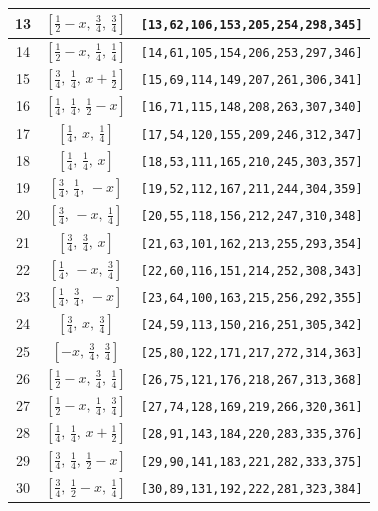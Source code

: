\documentclass[fleqn,8pt]{jsarticle}
\begin{document}
\begin{longtable}{ccc}
13 & $\left[ \frac{1}{2} - x,\, \frac{3}{4},\, \frac{3}{4} \right]$ & {\tt [13,62,106,153,205,254,298,345]} \\ \hline
14 & $\left[ \frac{1}{2} - x,\, \frac{1}{4},\, \frac{1}{4} \right]$ & {\tt [14,61,105,154,206,253,297,346]} \\ \hline
15 & $\left[ \frac{3}{4},\, \frac{1}{4},\, x + \frac{1}{2} \right]$ & {\tt [15,69,114,149,207,261,306,341]} \\ \hline
16 & $\left[ \frac{1}{4},\, \frac{1}{4},\, \frac{1}{2} - x \right]$ & {\tt [16,71,115,148,208,263,307,340]} \\ \hline
17 & $\left[ \frac{1}{4},\, x,\, \frac{1}{4} \right]$ & {\tt [17,54,120,155,209,246,312,347]} \\ \hline
18 & $\left[ \frac{1}{4},\, \frac{1}{4},\, x \right]$ & {\tt [18,53,111,165,210,245,303,357]} \\ \hline
19 & $\left[ \frac{3}{4},\, \frac{1}{4},\, - x \right]$ & {\tt [19,52,112,167,211,244,304,359]} \\ \hline
20 & $\left[ \frac{3}{4},\, - x,\, \frac{1}{4} \right]$ & {\tt [20,55,118,156,212,247,310,348]} \\ \hline
21 & $\left[ \frac{3}{4},\, \frac{3}{4},\, x \right]$ & {\tt [21,63,101,162,213,255,293,354]} \\ \hline
22 & $\left[ \frac{1}{4},\, - x,\, \frac{3}{4} \right]$ & {\tt [22,60,116,151,214,252,308,343]} \\ \hline
23 & $\left[ \frac{1}{4},\, \frac{3}{4},\, - x \right]$ & {\tt [23,64,100,163,215,256,292,355]} \\ \hline
24 & $\left[ \frac{3}{4},\, x,\, \frac{3}{4} \right]$ & {\tt [24,59,113,150,216,251,305,342]} \\ \hline
25 & $\left[ - x,\, \frac{3}{4},\, \frac{3}{4} \right]$ & {\tt [25,80,122,171,217,272,314,363]} \\ \hline
26 & $\left[ \frac{1}{2} - x,\, \frac{3}{4},\, \frac{1}{4} \right]$ & {\tt [26,75,121,176,218,267,313,368]} \\ \hline
27 & $\left[ \frac{1}{2} - x,\, \frac{1}{4},\, \frac{3}{4} \right]$ & {\tt [27,74,128,169,219,266,320,361]} \\ \hline
28 & $\left[ \frac{1}{4},\, \frac{1}{4},\, x + \frac{1}{2} \right]$ & {\tt [28,91,143,184,220,283,335,376]} \\ \hline
29 & $\left[ \frac{3}{4},\, \frac{1}{4},\, \frac{1}{2} - x \right]$ & {\tt [29,90,141,183,221,282,333,375]} \\ \hline
30 & $\left[ \frac{3}{4},\, \frac{1}{2} - x,\, \frac{1}{4} \right]$ & {\tt [30,89,131,192,222,281,323,384]} \\ \hline

\end{longtable}
\end{document}
